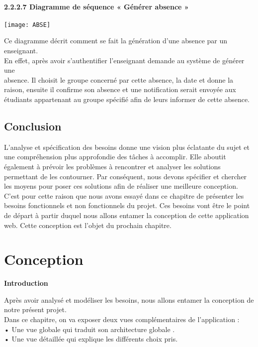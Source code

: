 \documentclass[a4paper,12pt,oneside]{report}
\begin{document}
\subsubsection{ 2.2.2.7 Diagramme de séquence « Générer absence »}
\begin{center}
\texttt{[image: ABSE]}
\label{fig1}
\end{center}
Ce diagramme décrit comment se fait la génération d'une absence par un enseignant.\\ En effet, après avoir s'authentifier l'enseignant demande au système de générer une \\ absence. Il choisit le groupe concerné par cette absence, la date et donne la raison, ensuite il confirme son absence et une notification serait envoyée aux étudiants appartenant au groupe spécifié afin de leurs informer de cette absence.
 
\section{Conclusion}
L'analyse et spécification des besoins donne une vision plus éclatante du sujet et une compréhension plus approfondie des tâches à accomplir. Elle aboutit également à prévoir les problèmes à
rencontrer et analyser les solutions permettant de les contourner. Par conséquent, nous devons spécifier et chercher les moyens pour poser ces solutions afin de réaliser une meilleure conception.\\  C'est pour cette raison que nous avons essayé dans ce chapitre de présenter les besoins fonctionnels et non fonctionnels du projet. Ces besoins vont être le point de départ à partir duquel nous allons entamer la conception de cette application web. Cette conception est l'objet du prochain chapitre.

  \chapter{Conception}
  \begin{flushleft}
  \textbf\Huge\bf Introduction
  \end{flushleft}
  Après avoir analysé et modéliser les besoins, nous allons entamer la conception de notre présent projet.\\
  Dans ce chapitre, on va exposer deux vues complémentaires de l'application :\\
• Une vue globale qui traduit son architecture globale . \\
• Une vue détaillée qui explique les différents choix pris.
\end{document}
